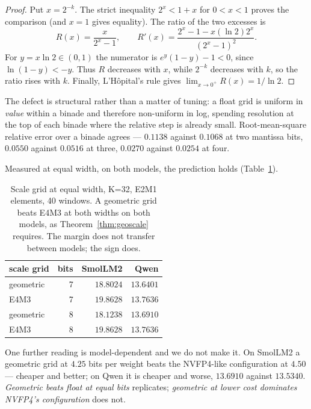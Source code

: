 \documentclass[11pt]{article}
\theoremstyle{definition}
\begin{document}
\begin{proof}
Put $x=2^{-k}$.  The strict inequality $2^x<1+x$ for
$0<x<1$ proves the comparison (and $x=1$ gives equality).  The ratio of
the two excesses is
\[
 R(x)=\frac{x}{2^x-1},\qquad
 R'(x)=\frac{2^x-1-x(\ln 2)2^x}{(2^x-1)^2}.
\]
For $y=x\ln 2\in(0,1)$ the numerator is
$e^y(1-y)-1<0$, since $\ln(1-y)<-y$.  Thus $R$ decreases with $x$,
while $2^{-k}$ decreases with $k$, so the ratio rises with $k$.  Finally,
L'Hôpital's rule gives $\lim_{x\to0^+}R(x)=1/\ln 2$.
\end{proof}

The defect is structural rather than a matter of tuning: a float grid is uniform
in \emph{value} within a binade and therefore non-uniform in log, spending
resolution at the top of each binade where the relative step is already small.
Root-mean-square relative error over a binade agrees --- $0.1138$ against
$0.1068$ at two mantissa bits, $0.0550$ against $0.0516$ at three, $0.0270$
against $0.0254$ at four.

Measured at equal width, on both models, the prediction holds
(Table~\ref{tab:geoscale}).

\begin{table}[t]\centering
\caption{Scale grid at equal width, K=32, E2M1 elements, 40 windows. A
geometric grid beats E4M3 at both widths on both models, as
Theorem~\ref{thm:geoscale} requires. The margin does not transfer between
models; the sign does.}
\label{tab:geoscale}
\begin{tabular}{lrrr}
\toprule
scale grid & bits & SmolLM2 & Qwen \\
\midrule
geometric & 7 & $\mathbf{18.8024}$ & $\mathbf{13.6401}$ \\
E4M3      & 7 & $19.8628$ & $13.7636$ \\
\addlinespace
geometric & 8 & $\mathbf{18.1238}$ & $\mathbf{13.6910}$ \\
E4M3      & 8 & $19.8628$ & $13.7636$ \\
\bottomrule
\end{tabular}
\end{table}

One further reading is model-dependent and we do not make it. On SmolLM2 a
geometric grid at $4.25$ bits per weight beats the NVFP4-like configuration at
$4.50$ --- cheaper and better; on Qwen it is cheaper and worse, $13.6910$
against $13.5340$. \emph{Geometric beats float at equal bits} replicates;
\emph{geometric at lower cost dominates NVFP4's configuration} does not.
\end{document}

